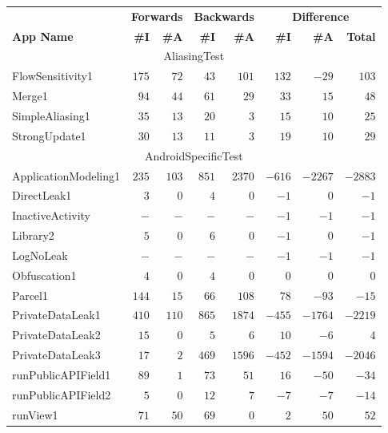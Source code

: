 \documentclass[../draft.tex]{subfiles}
\begin{document}
    \newcommand{\tsubEight}[1]{\multicolumn{8}{c}{#1}\\\hline}
    \begin{longtable}{l | r | r | r | r | r | r | r}
        & \multicolumn{2}{c|}{\textbf{Forwards}} & \multicolumn{2}{c|}{\textbf{Backwards}} & \multicolumn{3}{c}{\textbf{Difference}}\\
        \textbf{App Name} & \textbf{\#I} & \textbf{\#A} & \textbf{\#I} & \textbf{\#A} & \textbf{\#I} & \textbf{\#A}& \textbf{Total}\\
        \hline\hline
        \endhead
        \tsubEight{AliasingTest}
        FlowSensitivity1 & $175$ & $72$ & $43$ & $101$ & $132$ & $-29$ & $103$\\
        Merge1 & $94$ & $44$ & $61$ & $29$ & $33$ & $15$ & $48$\\
        SimpleAliasing1 & $35$ & $13$ & $20$ & $3$ & $15$ & $10$ & $25$\\
        StrongUpdate1 & $30$ & $13$ & $11$ & $3$ & $19$ & $10$ & $29$\\
        \hline
        \tsubEight{AndroidSpecificTest}
        ApplicationModeling1 & $235$ & $103$ & $851$ & $2370$ & $-616$ & $-2267$ & $-2883$\\
        DirectLeak1 & $3$ & $0$ & $4$ & $0$ & $-1$ & $0$ & $-1$\\
        InactiveActivity & $-$ & $-$ & $-$ & $-$ & $-1$ & $-1$ & $-1$\\
        Library2 & $5$ & $0$ & $6$ & $0$ & $-1$ & $0$ & $-1$\\
        LogNoLeak & $-$ & $-$ & $-$ & $-$ & $-1$ & $-1$ & $-1$\\
        Obfuscation1 & $4$ & $0$ & $4$ & $0$ & $0$ & $0$ & $0$\\
        Parcel1 & $144$ & $15$ & $66$ & $108$ & $78$ & $-93$ & $-15$\\
        PrivateDataLeak1 & $410$ & $110$ & $865$ & $1874$ & $-455$ & $-1764$ & $-2219$\\
        PrivateDataLeak2 & $15$ & $0$ & $5$ & $6$ & $10$ & $-6$ & $4$\\
        PrivateDataLeak3 & $17$ & $2$ & $469$ & $1596$ & $-452$ & $-1594$ & $-2046$\\
        runPublicAPIField1 & $89$ & $1$ & $73$ & $51$ & $16$ & $-50$ & $-34$\\
        runPublicAPIField2 & $5$ & $0$ & $12$ & $7$ & $-7$ & $-7$ & $-14$\\
        runView1 & $71$ & $50$ & $69$ & $0$ & $2$ & $50$ & $52$\\

\end{longtable}
\end{document}
